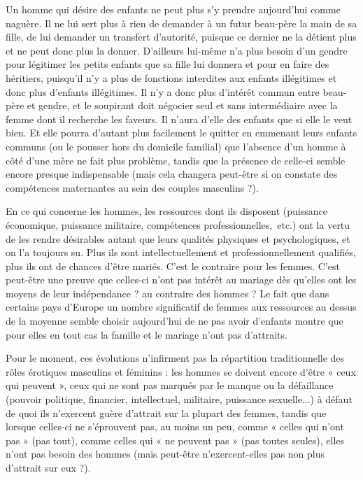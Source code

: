  Un homme qui désire des enfants ne peut plus s'y prendre aujourd'hui comme naguère. Il ne lui sert plus à rien de demander à un futur beau-père la main de sa fille, de lui demander un transfert d'autorité, puisque ce dernier ne la détient plus et ne peut donc plus la donner. D'ailleurs lui-même n'a plus besoin d'un gendre pour légitimer les petits enfants que sa fille lui donnera et pour en faire des héritiers, puisqu'il n'y a plus de fonctions interdites aux enfants illégitimes et donc plus d'enfants illégitimes. Il n'y a donc plus d'intérêt commun entre beau-père et gendre, et le soupirant doit négocier seul et sans intermédiaire avec la femme dont il recherche les faveurs. Il n'aura d'elle des enfants que si elle le veut bien. Et elle pourra d'autant plus facilement le quitter en emmenant leurs enfants communs (ou le pousser hors du domicile familial) que l'absence d'un homme à côté d'une mère ne fait plus problème, tandis que la présence de celle-ci semble encore presque indispensable (mais cela changera peut-être si on constate des compétences maternantes au sein des couples masculins ?). 
 
 En ce qui concerne les hommes, les ressources dont ils disposent (puissance économique, puissance militaire, compétences professionnelles,~etc.) ont la vertu de les rendre désirables autant que leurs qualités physiques et psychologiques, et on l'a toujours su. Plus ils sont intellectuellement et professionnellement qualifiés, plus ils ont de chances d'être mariés. C'est le contraire pour les femmes. C'est peut-être une preuve que celles-ci n'ont pas intérêt au mariage dès qu'elles ont les moyens de leur indépendance ? au contraire des hommes ? Le fait que dans certains pays d'Europe un nombre significatif de femmes aux ressources au dessus de la moyenne semble choisir aujourd'hui de ne pas avoir d'enfants montre que pour elles en tout cas la famille et le mariage n'ont pas d'attraits. 
 
 Pour le moment, ces évolutions n'infirment pas la répartition traditionnelle des rôles érotiques masculins et féminins : les hommes se doivent encore d'être « ceux qui peuvent », ceux qui ne sont pas marqués par le manque ou la défaillance (pouvoir politique, financier, intellectuel, militaire, puissance sexuelle...) à défaut de quoi ils n'exercent guère d'attrait sur la plupart des femmes, tandis que lorsque celles-ci ne s'éprouvent pas, au moins un peu, comme « celles qui n'ont pas » (pas tout), comme celles qui « ne peuvent pas » (pas toutes seules), elles n'ont pas besoin des hommes (mais peut-être n'exercent-elles pas non plus d'attrait sur eux ?).
 
